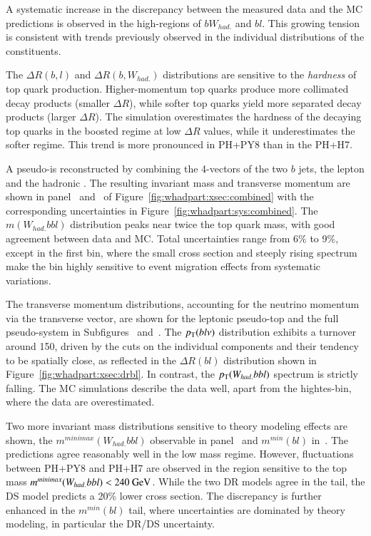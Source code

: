 A systematic increase in the discrepancy between the measured data and the MC predictions is observed in the high-\pt regions of $bW_{had.}$ and $bl$. This growing tension is consistent with trends previously observed in the individual distributions of
the constituents.

The $\Delta R(b,l)$ and $\Delta R(b,W_{had.})$ distributions are 
sensitive to the \textit{hardness} of top quark production.
Higher-momentum top quarks produce more collimated decay products (smaller
$\Delta R$), while softer top quarks yield more separated decay products (larger $\Delta R$).
The simulation overestimates the hardness of the decaying top quarks in the boosted regime at low $\Delta R$ values, while it underestimates the softer regime.
This trend is more pronounced in PH+PY8 than in the PH+H7.

A pseudo-\ttbar is reconstructed by combining the 4-vectors of the two $b$ jets, the lepton and the hadronic \Wboson.
The resulting invariant mass and transverse momentum are shown in panel~ and~
of Figure~\ref{fig:whadpart:xsec:combined}
with the corresponding uncertainties in Figure~\ref{fig:whadpart:sys:combined}.
The $m(W_{had.}bbl)$ distribution peaks near twice the top quark mass, with good agreement between data and MC. Total uncertainties range from 
6\% to 9\%, except in the first bin, where the small cross section and steeply rising spectrum make the bin highly sensitive to event migration effects from systematic variations.

The transverse momentum distributions, accounting for the neutrino momentum via the transverse \ETmiss vector, are shown for the leptonic pseudo-top and the full pseudo-\ttbar system in Subfigures~ and~.
The $p_{\text{T}}(bl\nu)$ distribution exhibits a turnover around 150\GeV, driven by the \pt cuts on the individual components and their tendency to be spatially close, as reflected in the
$\Delta R(bl)$ distribution shown in Figure~\ref{fig:whadpart:xsec:drbl}.
In contrast, the $p_{\text{T}}(W_{had.}bbl)$ spectrum is strictly falling.
The MC simulations describe the data well,
apart from the hightes-\pt bin, where the data are overestimated.

Two more invariant mass distributions sensitive to theory modeling effects
are shown, the $m^{minimax}(W_{had.}bbl)$ observable in panel~ and $m^{min}(bl)$ in~.
The predictions agree reasonably well in the low mass regime.
However, fluctuations between PH+PY8 and PH+H7 are observed in the region sensitive to the top mass $m^{minimax}(W_{had.}bbl) < 240~\text{GeV}$.
While the two DR models agree in the tail, the DS model predicts a 20\% lower cross section. The discrepancy is further enhanced in the
$m^{min}(bl)$ tail, where uncertainties are dominated by theory modeling, in particular the DR/DS uncertainty.




